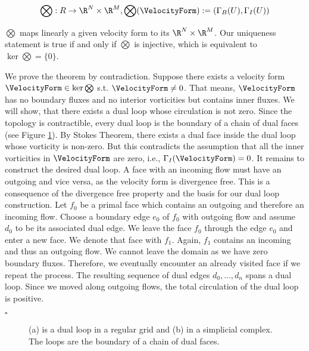 \begin{equation}
\bigotimes : R \rightarrow \R^N \times \R^M , \bigotimes(\VelocityForm) := (\Gamma_B(U),\Gamma_I(U))
\end{equation}

$\bigotimes$ maps linearly a given velocity form to its  $\R^N \times \R^M$.
Our uniqueness statement is true if and only if $\bigotimes$ is injective, which is equivalent to $\ker \bigotimes = \{0\}$.

\newpage
{}
We prove the theorem by contradiction. Suppose there exists a velocity form $\VelocityForm \in \ker \bigotimes$ s.t. $\VelocityForm \neq 0$. 
That means, $\VelocityForm$ has no boundary fluxes and no interior vorticities but contains inner fluxes.
We will show, that there exists a dual loop whose circulation is not zero. Since the topology is contractible,
every dual loop is the boundary of a chain of dual faces (see Figure \ref{fig:DualLoop}).
By Stokes Theorem, there exists a dual face inside the dual loop whose vorticity is non-zero. 
But this contradicts the assumption that all the inner vorticities in $\VelocityForm$ are zero, i.e., $\Gamma_I(\VelocityForm)=0$.
It remains to construct the desired dual loop.
A face with an incoming flow must have an outgoing and vice versa, as the velocity form is divergence free.
This is a consequence of the divergence free property and the basis for our dual loop construction.
Let $f_0$ be a primal face which contains an outgoing and therefore an incoming flow. 
Choose a boundary edge $e_0$ of $f_0$ with outgoing flow and assume $d_0$ to be its associated dual edge. 
We leave the face $f_0$ through the edge $e_0$ and enter a new face.
We denote that face with $f_1$.
Again, $f_1$ contains an incoming and thus an outgoing flow.
We cannot leave the domain as we have zero boundary fluxes.
Therefore, we eventually encounter an already visited face if we repeat the process.
The resulting sequence of dual edges $d_0 , ... , d_n$ spans a dual loop.
Since we moved along outgoing flows, the total circulation of the dual loop is positive.
\begin{flushright}
$\square$
\end{flushright}

\begin{figure}[h!]
	\begin{minipage}[b]{0.5 \linewidth}
		\centering
		\subfigure[]{
			      }
	\end{minipage}
	\begin{minipage}[b]{0.5 \linewidth}
		\centering
		\subfigure[]{
			      }
	\end{minipage}	
	\caption[A dual loop in a regular grid and simplicial complex]
			{(a) is a dual loop in a regular grid and (b) in a simplicial complex. The loops are the boundary of a chain of dual faces.}
	\label{fig:DualLoop}
\end{figure}

